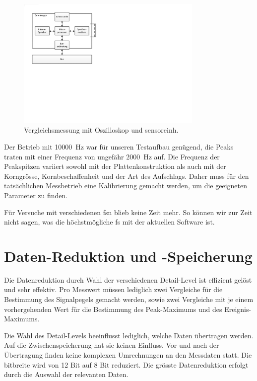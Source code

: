 \begin{figure}
	\centering
		\includegraphics[width=0.8\textwidth]{images/visio/hardwarekonzept_logger.pdf}
	\caption{Vergleichsmessung mit Oszilloskop und \gls{sensoreinh}.}
	\label{fig.comparison}
\end{figure}


Der Betrieb mit 10000~Hz war für unseren Testaufbau genügend, die Peaks traten mit einer Frequenz von ungefähr 2000~Hz auf. Die Frequenz der Peakspitzen variiert sowohl mit der Plattenkonstruktion als auch mit der Korngrösse, Kornbeschaffenheit und der Art des Aufschlags. Daher muss für den tatsächlichen Messbetrieb eine Kalibrierung gemacht werden, um die geeigneten Parameter zu finden.

Für Versuche mit verschiedenen \gls{fs}n blieb keine Zeit mehr. So können wir zur Zeit nicht sagen, was die höchstmögliche \gls{fs} mit der aktuellen Software ist.

\section{Daten-Reduktion und -Speicherung}
Die Datenreduktion durch Wahl der verschiedenen Detail-Level ist effizient gelöst und sehr effektiv. Pro Messwert müssen lediglich zwei Vergleiche für die Bestimmung des Signalpegels gemacht werden, sowie zwei Vergleiche mit je einem vorhergehenden Wert für die Bestimmung des Peak-Maximums und des Ereignis-Maximums.

Die Wahl des Detail-Levels beeinflusst lediglich, welche Daten übertragen werden. Auf die Zwischenspeicherung hat sie keinen Einfluss. Vor und nach der Übertragung finden keine komplexen Umrechnungen an den Messdaten statt. Die \gls{bitbreite} wird von 12 Bit auf 8 Bit reduziert. Die grösste Datenreduktion erfolgt durch die Auswahl der relevanten Daten.

